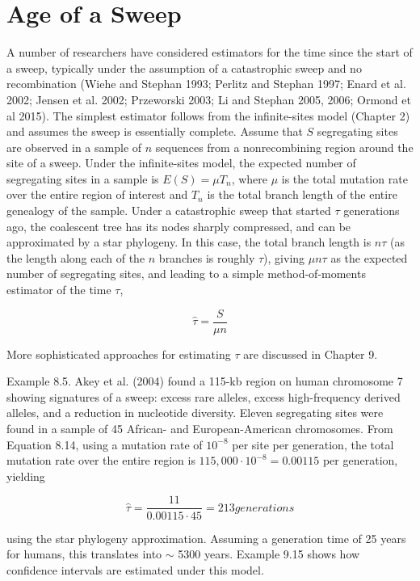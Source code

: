 \documentclass{article}
\begin{document}
\section{Age of a Sweep}
A number of researchers have considered estimators for the time since the start of a sweep, typically under the assumption of a catastrophic sweep and no recombination (Wiehe and Stephan 1993; Perlitz and Stephan 1997; Enard et al. 2002; Jensen et al. 2002; Przeworski 2003; Li and Stephan 2005, 2006; Ormond et al 2015). The simplest estimator follows from the infinite-sites model (Chapter 2) and assumes the sweep is essentially complete. Assume that $S$ segregating sites are observed in a sample of $n$ sequences from a nonrecombining region around the site of a sweep. Under the infinite-sites model, the expected number of segregating sites in a sample is $E(S) = \mu T_n$, where $\mu$ is the total mutation rate over the entire region of interest and $T_n$ is the total branch length of the entire genealogy of the sample. Under a catastrophic sweep that started $\tau$ generations ago, the coalescent tree has its nodes sharply compressed, and can be approximated by a star phylogeny. In this case, the total branch length is $n\tau$ (as the length along each of the $n$ branches is roughly $\tau$), giving $\mu n\tau$ as the expected number of segregating sites, and leading to a simple method-of-moments estimator of the time $\tau$,

\begin{equation}
\widehat{\tau}=\frac{S}{\mu n}
\tag{8.14}
\label{eq:8_14}
\end{equation}

More sophisticated approaches for estimating  $ \tau $ are discussed in Chapter 9.

Example 8.5. Akey et al. (2004) found a 115-kb region on human chromosome 7 showing signatures of a sweep: excess rare alleles, excess high-frequency derived alleles, and a reduction in nucleotide diversity. Eleven segregating sites were found in a sample of 45 African- and European-American chromosomes. From Equation 8.14, using a mutation rate of  $ 10^{-8} $ per site per generation, the total mutation rate over the entire region is  $ 115,000 \cdot 10^{-8} = 0.00115 $ per generation, yielding

\begin{equation}
\widehat{\tau}=\frac{11}{0.00115\cdot45}=213generations
\end{equation}

using the star phylogeny approximation. Assuming a generation time of 25 years for humans, this translates into  $ \sim $ 5300 years. Example 9.15 shows how confidence intervals are estimated under this model.
\end{document}
